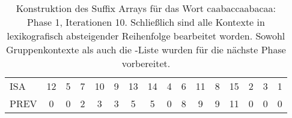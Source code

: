 \begin{table}[H]
\begin{adjustbox}{max width=\textwidth}
\begin{tabular}{lccccccccccccccc}
\multicolumn{1}{l|}{ISA}     & 12                        & 5  & 7                       & 10                         & 9                           & 13                        & 14                         & 4                       & 6                        & 11 & 8                       & 15 & 2  & 3  & 1                         \\
\multicolumn{1}{l|}{PREV}    & 0                         & 0  & 2                       & 3                          & 3                           & 5                         & 5                          & 0                       & 8                        & 9  & 9                       & 11 & 0  & 0  & \cellcolor[HTML]{\red}0
\end{tabular}
\end{adjustbox}

\caption[Konstruktion des Suffix Arrays für das Wort caabaccaabacaa: Phase 1, Iterationen 10]{Konstruktion des Suffix Arrays für das Wort caabaccaabacaa: Phase 1, Iterationen 10. Schließlich sind alle Kontexte in lexikografisch absteigender Reihenfolge bearbeitet worden. Sowohl Gruppenkontexte als auch die \prevpointer-Liste wurden für die nächste Phase vorbereitet.}
\label{table_complex_example_1_10} 
\end{table}
